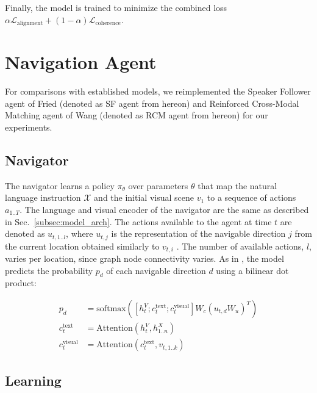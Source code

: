\documentclass[10pt,twocolumn,letterpaper]{article}
\begin{document}
Finally, the model is trained to minimize the combined loss $\alpha \mathcal{L}_\text{alignment} + (1 - \alpha) \mathcal{L}_\text{coherence}$. 
 
\section{Navigation Agent}
\label{sec:navigation_agent}

For comparisons with established models, we reimplemented the Speaker Follower agent of Fried \etal \cite{Fried:2018:Speaker} (denoted as SF agent from hereon) and Reinforced Cross-Modal Matching agent of Wang \etal \cite{Wang:2018:RCM} (denoted as RCM agent from hereon) for our experiments.

\subsection{Navigator}
\label{sec:navigator}

The navigator learns a policy $\pi_{\theta}$ over parameters $\theta$ that map the natural language instruction $\mathcal{X}$ and the initial visual scene $v_1$ to a sequence of actions $a_{1..T}$. The language and visual encoder of the navigator are the same as described in Sec.~\ref{subsec:model_arch}. The actions available to the agent at time $t$ are denoted as $u_{t,1..l}$, where $u_{t,j}$ is the representation of the navigable direction $j$ from the current location obtained similarly to $v_{t,i}$ \cite{Fried:2018:Speaker}. The number of available actions, $l$, varies per location, since graph node connectivity varies. As in \cite{Wang:2018:RCM}, the model predicts the probability $p_d$ of each navigable direction $d$ using a bilinear dot product:

\begin{small}
\begin{align}
p_d &= \text{softmax}([h_t^V; c_t^{\text{text}}; c_t^{\text{visual}}]W_c(u_{t,d}W_u)^T)\\
c_t^{\text{text}} &= \text{Attention}(h_t^V, h^X_{1..n}) \\
c_t^{\text{visual}} &= \text{Attention}(c_t^{\text{text}}, v_{t, 1..k})
\end{align}
\end{small}

\subsection{Learning}
\label{sec:learning}
\end{document}
